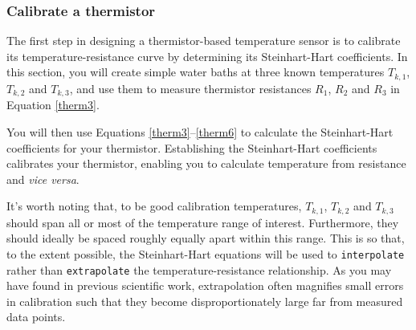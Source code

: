 
\subsubsection{\howto Calibrate a thermistor}
The first step in designing a thermistor-based temperature sensor is to calibrate its temperature-resistance curve by determining its Steinhart-Hart coefficients.
In this section, you will create simple water baths at three known temperatures $T_{k,1}$, $T_{k,2}$ and $T_{k,3}$, and use them to measure thermistor resistances $R_1$, $R_2$ and $R_3$ in Equation \ref{therm3}.

You will then use Equations \ref{therm3}--\ref{therm6} to calculate the Steinhart-Hart coefficients for your thermistor.
Establishing the Steinhart-Hart coefficients calibrates your thermistor, enabling you to calculate temperature from resistance and \textit{vice versa}.

It's worth noting that, to be good calibration temperatures, $T_{k,1}$, $T_{k,2}$ and $T_{k,3}$ should span all or most of the temperature range of interest.
Furthermore, they should ideally be spaced roughly equally apart within this range.
This is so that, to the extent possible, the Steinhart-Hart equations will be used to \texttt{interpolate} rather than \texttt{extrapolate} the temperature-resistance relationship.
As you may have found in previous scientific work, extrapolation often magnifies small errors in calibration such that they become disproportionately large far from measured data points.

